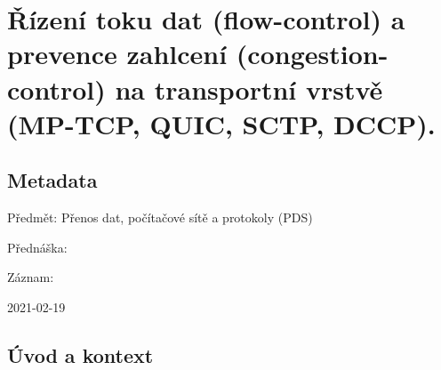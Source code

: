 

\graphicspath{{pds/rizeni_toku_a_prevence_zahlceni}}


\chapter{Řízení toku dat (flow-control) a prevence zahlcení (congestion-control) na transportní vrstvě (MP-TCP, QUIC, SCTP, DCCP).}


\section{Metadata}

\begin{compactitem}
    \item Předmět: Přenos dat, počítačové sítě a protokoly (PDS)
    \item Přednáška:
    \begin{compactitem}
        \item {}
    \end{compactitem}
    \item Záznam:
    \begin{compactitem}
        \item 2021-02-19
    \end{compactitem}
\end{compactitem}


\section{Úvod a kontext}

